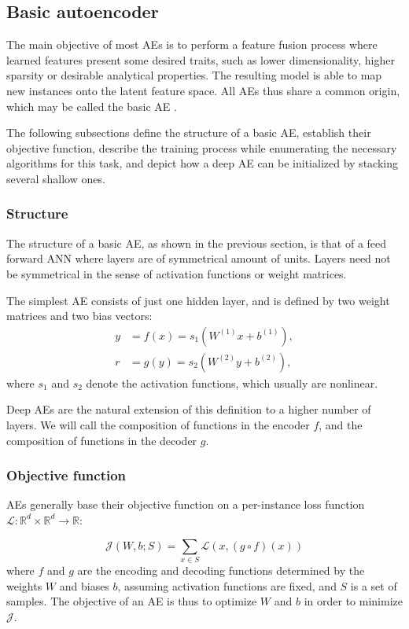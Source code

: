 \documentclass[preprint,5p,compress]{elsarticle}
\begin{document}
\subsection{Basic autoencoder}\label{Sec.BasicAE}

The main objective of most AEs is to perform a feature fusion process where learned features present some desired traits, such as lower dimensionality, higher sparsity or desirable analytical properties. The resulting model is able to map new instances onto the latent feature space. All AEs thus share a common origin, which may be called the basic AE \cite{bourlard_auto-association_1988}.

The following subsections define the structure of a basic AE, establish their objective function, describe the training process while enumerating the necessary algorithms for this task, and depict how a deep AE can be initialized by stacking several shallow ones.


\subsubsection{Structure}

The structure of a basic AE, as shown in the previous section, is that of a feed forward ANN where layers are of symmetrical amount of units. Layers need not be symmetrical in the sense of activation functions or weight matrices.

The simplest AE consists of just one hidden layer, and is defined by two weight matrices and two bias vectors:
\begin{align}
  y&=f(x)=s_1(W^{(1)}x+b^{(1)}),\\
  r&=g(y)=s_2(W^{(2)}y+b^{(2)}),
\end{align}
where $s_1$ and $s_2$ denote the activation functions, which usually are nonlinear.

Deep AEs are the natural extension of this definition to a higher number of layers. We will call the composition of functions in the encoder $f$, and the composition of functions in the decoder $g$.

\subsubsection{Objective function}

AEs generally base their objective function on a per-instance loss function $\mathcal L:\mathbb R^d\times \mathbb R^d\rightarrow \mathbb R$:

\begin{equation}
\mathcal J(W,b;S)= \sum_{x \in S} \mathcal L(x, (g\circ f)(x))
\end{equation}
where $f$ and $g$ are the encoding and decoding functions determined by the weights $W$ and biases $b$, assuming activation functions are fixed, and $S$ is a set of samples. The objective of an AE is thus to optimize $W$ and $b$ in order to minimize $\mathcal J$.
\end{document}
